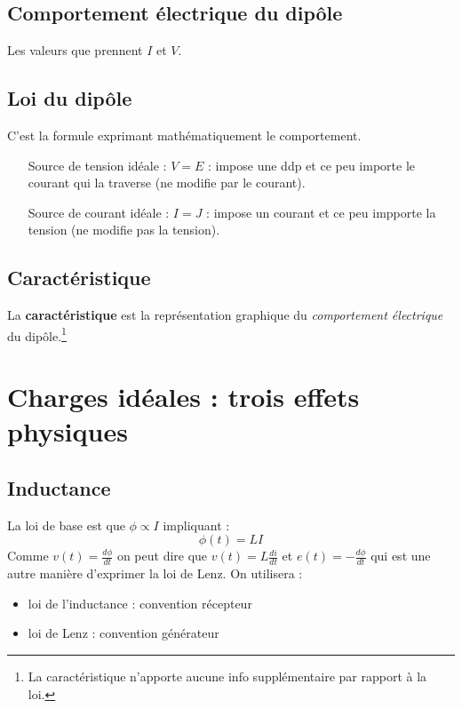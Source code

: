 \documentclass[british,french,11pt, a4paper, openany]{book}
\begin{document}
		\subsection{Comportement électrique du dipôle}
		Les valeurs que prennent $I$ et $V$.
		
		\subsection{Loi du dipôle}
		C'est la formule exprimant mathématiquement le comportement.
		\begin{itemize}
			\item[Source de tension idéale] : $V = E$ : impose une ddp et ce peu importe le courant qui la traverse (ne modifie par le courant).
			\item[Source de courant idéale] : $I = J$ : impose un courant et ce peu impporte la tension (ne modifie pas la tension).
		\end{itemize}
		
		\subsection{Caractéristique}
		La \textbf{caractéristique} est la représentation graphique du \textit{comportement électrique} du dipôle.\footnote{La caractéristique n'apporte aucune info supplémentaire par rapport à la loi.}
		
		\setcounter{section}{2}
		\section{Charges idéales : trois effets physiques}
		\setcounter{subsection}{1}
		\subsection{Inductance}
		La loi de base est que $\phi \propto I$ impliquant :
		\begin{equation}
		\phi (t) = LI
		\end{equation}
		Comme $v(t) = \frac{d\phi}{dt}$ on peut dire que $v(t) = L\frac{di}{dt}$ et $e(t) = -\frac{d\phi}{dt}$ qui est une autre manière d'exprimer la loi de Lenz. On utilisera :
		\begin{itemize}
			\item loi de l'inductance : convention récepteur
			\item loi de Lenz : convention générateur
		\end{itemize}
		
\end{document}
